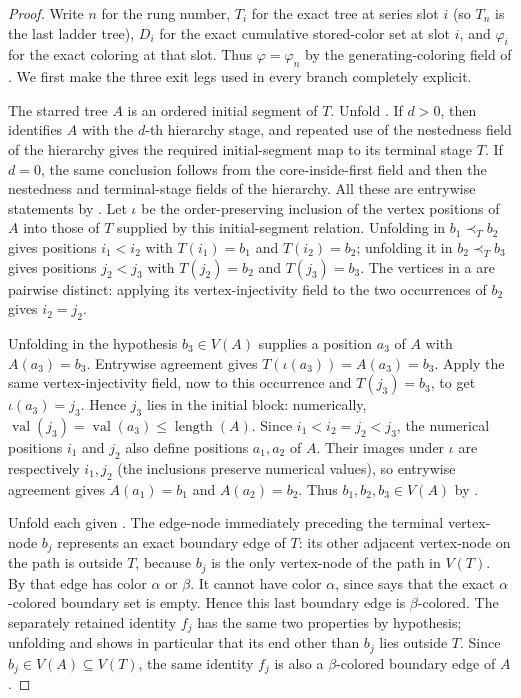 \begin{proof}
Write $n$ for the rung number, $T_i$ for the exact tree at series slot
$i$ (so $T_n$ is the last ladder tree), $D_i$ for the exact cumulative
stored-color set at slot $i$, and $\varphi_i$ for the exact coloring at
that slot.  Thus $\varphi=\varphi_n$ by the
generating-coloring field of .  We first
make the three exit legs used in every branch completely explicit.

The starred tree $A$ is an ordered initial segment of $T$.  Unfold
.  If $d>0$, then
 identifies $A$ with the $d$-th hierarchy
stage, and repeated use of the nestedness field of the hierarchy gives
the required initial-segment map to its terminal stage $T$.  If $d=0$,
the same conclusion follows from the core-inside-first field and then the
nestedness and terminal-stage fields of the hierarchy.  All these are
entrywise statements by .  Let
$\iota$ be the order-preserving inclusion of the vertex positions of $A$
into those of $T$ supplied by this initial-segment relation.  Unfolding
 in $b_1\prec_T b_2$ gives positions $i_1<i_2$
with $T(i_1)=b_1$ and $T(i_2)=b_2$; unfolding it in
$b_2\prec_T b_3$ gives positions $j_2<j_3$ with $T(j_2)=b_2$ and
$T(j_3)=b_3$.  The vertices in a  are pairwise
distinct: applying its vertex-injectivity field to the two occurrences of
$b_2$ gives $i_2=j_2$.

Unfolding  in the hypothesis
$b_3\in V(A)$ supplies a position $a_3$ of $A$ with $A(a_3)=b_3$.
Entrywise agreement gives $T(\iota(a_3))=A(a_3)=b_3$.  Apply the same
vertex-injectivity field, now to this occurrence and $T(j_3)=b_3$, to get
$\iota(a_3)=j_3$.  Hence $j_3$ lies in the initial block: numerically,
$\operatorname{val}(j_3)=\operatorname{val}(a_3)
\leq\operatorname{length}(A)$.  Since
$i_1<i_2=j_2<j_3$, the numerical positions $i_1$ and $j_2$ also define
positions $a_1,a_2$ of $A$.  Their images under $\iota$ are respectively
$i_1,j_2$ (the inclusions preserve numerical values), so entrywise
agreement gives $A(a_1)=b_1$ and $A(a_2)=b_2$.  Thus
$b_1,b_2,b_3\in V(A)$ by .

Unfold each given .  The edge-node immediately
preceding the terminal vertex-node $b_j$ represents an exact boundary
edge of $T$: its other adjacent vertex-node on the path is outside $T$,
because $b_j$ is the only vertex-node of the path in $V(T)$.  By
 that edge has color $\alpha$ or
$\beta$.  It cannot have color $\alpha$, since
 says that the exact $\alpha$-colored
boundary set is empty.  Hence this last boundary edge is
$\beta$-colored.  The separately retained identity $f_j$ has the same
two properties by hypothesis; unfolding 
and  shows in particular that its end other than
$b_j$ lies outside $T$.  Since $b_j\in V(A)\subseteq V(T)$, the same
identity $f_j$ is also a $\beta$-colored boundary edge of $A$.


\end{proof}
